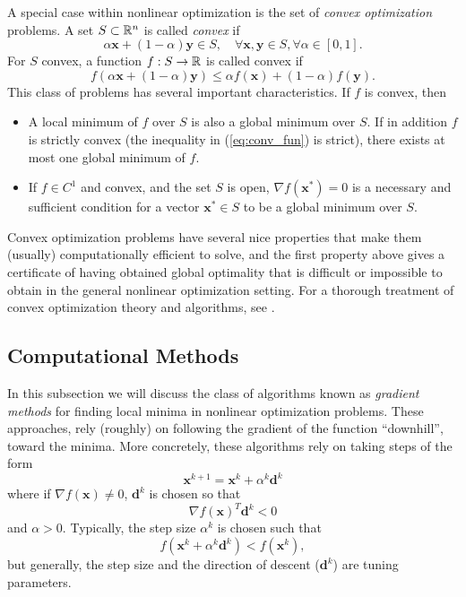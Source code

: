 A special case within nonlinear optimization is the set of \textit{convex optimization} problems. A set $S \subset \mathbb{R}^n$ is called \textit{convex} if 
\begin{equation}
    \alpha \bm{x} + (1 - \alpha) \bm{y} \in S, \quad \forall \bm{x},\bm{y} \in S, \forall \alpha \in [0,1].
\end{equation}
For $S$ convex, a function $f:S\to\mathbb{R}$ is called convex if 
\begin{equation}
    f(\alpha \bm{x} + (1-\alpha) \bm{y}) \leq \alpha f(\bm{x}) + (1-\alpha) f(\bm{y}).
    \label{eq:conv_fun}
\end{equation}
This class of problems has several important characteristics. If $f$ is convex, then
\begin{itemize}
    \item A local minimum of $f$ over $S$ is also a global minimum over $S$. If in addition $f$ is strictly convex (the inequality in (\ref{eq:conv_fun}) is strict), there exists at most one global minimum of $f$.
    \item If $f \in C^1$ and convex, and the set $S$ is open, $\nabla f(\bm{x}^*) = 0$ is a necessary and sufficient condition for a vector $\bm{x}^* \in S$ to be a global minimum over $S$.
\end{itemize}
Convex optimization problems have several nice properties that make them (usually) computationally efficient to solve, and the first property above gives a certificate of having obtained global optimality that is difficult or impossible to obtain in the general nonlinear optimization setting. For a thorough treatment of convex optimization theory and algorithms, see \cite{boyd2004convex}. 

\subsection{Computational Methods}


In this subsection we will discuss the class of algorithms known as \textit{gradient methods} for finding local minima in nonlinear optimization problems. These approaches, rely (roughly) on following the gradient of the function ``downhill'', toward the minima. More concretely, these algorithms rely on taking steps of the form
\begin{equation}
    \bm{x}^{k+1} = \bm{x}^k + \alpha^{k} \bm{d}^k
\end{equation}
where if $\nabla f(\bm{x}) \neq 0$, $\bm{d}^k$ is chosen so that 
\begin{equation}
    \nabla f(\bm{x})^T \bm{d}^k < 0
\end{equation}
and $\alpha > 0$. Typically, the step size $\alpha^k$ is chosen such that 
\begin{equation}
    f(\bm{x}^k + \alpha^k \bm{d}^k) < f(\bm{x}^k),
\end{equation}
but generally, the step size and the direction of descent ($\bm{d}^k$) are tuning parameters. 


